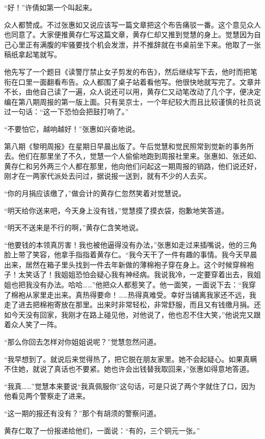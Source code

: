 \par “好！”许倩如第一个叫起来。
\par 众人都赞成。不过张惠如又说应该写一篇文章把这个布告痛驳一番。这个意见众人也同意了。大家便推黄存仁写这篇文章，黄存仁却又推到觉慧的身上。觉慧因为自己心里正有满腹的牢骚要找个机会发泄，并不推辞就在书桌前坐下来。他取了一张稿纸拿起笔就写。
\par 他先写了一个题目《读警厅禁止女子剪发的布告》，然后继续写下去，他时而把笔衔在口里一面翻看布告。众人都围了桌子站着看他写。他很快地就写完了。文章并不长，由他自己读了一遍，众人说还可以用，黄存仁又动笔改动了几个字，便决定编在第八期周报的第一版上面。只有吴京士，一个年纪较大而且比较谨慎的社员说过一句话：“这一下恐怕会把鼓打响了。”
\par “不要怕它，越响越好！”张惠如兴奋地说。
\par 第八期《黎明周报》在星期日早晨出版了。午后觉慧和觉民照常到觉新的事务所去。他们在那里坐了不久，觉慧一个人偷偷地跑到周报社里来。张惠如、张还如、黄存仁和另外两三个人都在那里，他向他们问起这一期周报的销路，他们说还好，刚才在一两家代派处去问过，据说报一送到，就有不少的人去买。
\par “你的月捐应该缴了，”做会计的黄存仁忽然笑着对觉慧说。
\par “明天给你送来吧，今天身上没有钱，”觉慧摸了摸衣袋，抱歉地笑答道。
\par “明天不送来是不行的啊，”黄存仁含笑地说。
\par “他要钱的本领真厉害！我也被他逼得没有办法，”张惠如走过来插嘴说，他的三角脸上带了笑容，他拿手指指着黄存仁。“我今天干了一件有趣的事情。我今天早晨出来，居然在箱子里头找到一件去年新做的薄棉袍子穿在身上。这个时候穿棉袍子！太笑话了！我姐姐恐怕会疑心我有神经病。我说我冷，一定要穿着出去，我姐姐也把我没有办法。哈哈……”他把众人都惹笑了。他一面笑，一面说下去：“我穿了棉袍从家里走出来。真热得要命！……热得真难受。幸好当铺离我家还不远，我走了进去把棉袍寄放在那里。出来时非常轻松，非常舒服，而且又有钱缴月捐。还如今天没有回家，我刚才在路上碰见他，对他说了，他也忍不住大笑，”他说完又跟着众人笑了一阵。
\par “那么你回去怎样对你姐姐说呢？”觉慧忽然问道。
\par “我早想到了。就说后来觉得热了，把它脱在朋友家里。她不会起疑心。如果真瞒不住她，就说了真话也不要紧。她也许会出钱替我取回来，”张惠如得意地答道。
\par “我真……”觉慧本来要说“我真佩服你”这句话，可是只说了两个字就住了口，因为他看见两个警察走了进来。
\par “这一期的报还有没有？”那个有胡须的警察问道。
\par 黄存仁取了一份报递给他们，一面说：“有的，三个铜元一张。”

